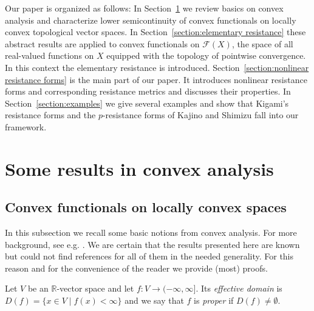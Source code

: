 \documentclass[a4paper,11pt,reqno]{amsart}
\theoremstyle{definition}
\numberwithin{equation}{section}
\newcommand{\cF}{{\mathcal F}}
\newcommand{\R}{{\mathbb R}}
\newcommand{\1}{\mathds{1}}
\begin{document}
Our paper is organized as follows: In  Section~\ref{section:convex analysis} we review basics on convex analysis and characterize lower semicontinuity of convex functionals on locally convex topological vector spaces. In Section~\ref{section:elementary resistance} these abstract results are applied to convex functionals on $\cF(X)$, the space of all real-valued functions on $X$ equipped with the topology of pointwise convergence. In this context the elementary resistance is introduced. Section~\ref{section:nonlinear resistance forms} is the main part of our paper. It introduces nonlinear resistance forms and corresponding resistance metrics and discusses their properties. In Section~\ref{section:examples} we give several examples and show that Kigami's resistance forms and the $p$-resistance forms of Kajino and Shimizu fall into our framework.

%  


\section{Some results in convex analysis}  \label{section:convex analysis}


\subsection{Convex functionals on locally convex spaces} \label{subsection:convex functionals}
In this subsection we recall some basic notions from convex analysis. For more background, see e.g. \cite{ET99,Zua02}. We are certain that  the results presented here are known but could not find references for all of them in the needed generality. For this reason and for the convenience of the reader we provide (most) proofs. 


Let $V$ be an $\R$-vector space and let $f \colon V \to (-\infty,\infty]$. Its {\em effective domain} is $D(f) = \{x \in V \mid f(x) < \infty\}$ and we say that $f$ is {\em proper} if $D(f) \neq \emptyset$. 
\end{document}
